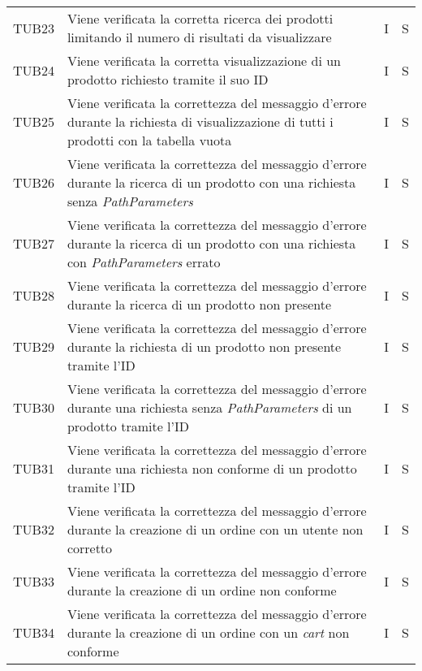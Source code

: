 {\begin{longtable}{C{2cm} C{9.6cm} C{1.5cm} C{1cm}}
TUB23 & Viene verificata la corretta ricerca dei prodotti limitando il numero di risultati da visualizzare & I & S\\

TUB24 & Viene verificata la corretta visualizzazione di un prodotto richiesto tramite il suo ID & I & S\\

TUB25 & Viene verificata la correttezza del messaggio d'errore durante la richiesta di visualizzazione di tutti i prodotti con la tabella vuota & I & S\\

TUB26 & Viene verificata la correttezza del messaggio d'errore durante la ricerca di un prodotto con una richiesta senza \textit{PathParameters} & I & S\\

TUB27 & Viene verificata la correttezza del messaggio d'errore durante la ricerca di un prodotto con una richiesta con \textit{PathParameters} errato & I & S\\

TUB28 & Viene verificata la correttezza del messaggio d'errore durante la ricerca di un prodotto non presente & I & S\\

TUB29 & Viene verificata la correttezza del messaggio d'errore durante la richiesta di un prodotto non presente tramite l'ID & I & S\\

TUB30 & Viene verificata la correttezza del messaggio d'errore durante una richiesta senza \textit{PathParameters} di un prodotto tramite l'ID & I & S\\

TUB31 & Viene verificata la correttezza del messaggio d'errore durante una richiesta non conforme di un prodotto tramite l'ID & I & S\\

TUB32 & Viene verificata la correttezza del messaggio d'errore durante la creazione di un ordine con un utente non corretto & I & S\\

TUB33 & Viene verificata la correttezza del messaggio d'errore durante la creazione di un ordine non conforme & I & S\\

TUB34 & Viene verificata la correttezza del messaggio d'errore durante la creazione di un ordine con un \textit{cart} non conforme & I & S\\


\end{longtable}}
